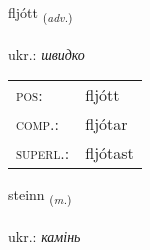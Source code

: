 \documentclass[frontgrid, backgrid]{flacards}\usepackage[]{graphicx}\usepackage[]{xcolor}
\begin{document}
\renewcommand{\flhead}{\vskip5pt \fboxsep=0pt {\small\bfseries\footnotesize Atviksorð | прислівник}}
\renewcommand{\fcfoot}{\vskip5pt \fboxsep=0pt \hspace{2pt}{\small\bfseries\footnotesize 2K}}

\renewcommand{\blhead}{\vskip5pt {\small\bfseries\footnotesize Atviksorð | прислівник }}
\renewcommand{\bcfoot}{\vskip5pt \hspace{2pt}{\small\bfseries\footnotesize 2K}}


{fljótt \small{\textsubscript{(\textit{adv.})}} \\[1ex] %
\textphonetic{[fljouht]} \\
ukr.: \emph{швидко} \\  [2ex]
\renewcommand*{\arraystretch}{0.8}
\begin{tabular}{ll}
\textsc{pos}: & fljótt \\ 
\textsc{comp.}: & fljótar \\ 
\textsc{superl.}: & fljótast \\
\end{tabular}
}

\renewcommand{\flhead}{\vskip5pt \fboxsep=0pt {\small\bfseries\footnotesize Nafnorð | іменник}}
\renewcommand{\fcfoot}{\vskip5pt \fboxsep=0pt \hspace{2pt}{\small\bfseries\footnotesize 2K}}

\renewcommand{\blhead}{\vskip5pt {\small\bfseries\footnotesize Nafnorð | іменник }}
\renewcommand{\bcfoot}{\vskip5pt \hspace{2pt}{\small\bfseries\footnotesize 2K}}


{steinn \small{\textsubscript{(\textit{m.})}} \\[1ex] %
\textphonetic{[steitn̥]} \\
ukr.: \emph{камінь} \\  [2ex]
\renewcommand*{\arraystretch}{0.8}
}
\end{document}
